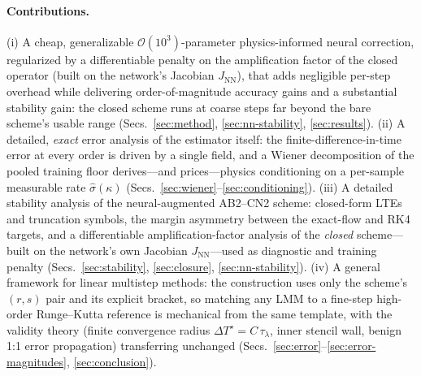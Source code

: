 \documentclass[11pt]{article}
\theoremstyle{plain}
\theoremstyle{definition}
\newcommand{\bO}{\mathcal{O}}
\newcommand{\DTs}{\Delta T^{\star}}
\newcommand{\taul}{\tau_{\lambda}}
\newcommand{\shat}{\hat{\sigma}}
\begin{document}
\paragraph{Contributions.}
(i) A cheap, generalizable $\bO(10^3)$-parameter physics-informed neural
correction, regularized by a differentiable penalty on the amplification
factor of the closed operator (built on the network's Jacobian $J_{\mathrm{NN}}$),
that adds negligible per-step overhead while delivering
order-of-magnitude accuracy gains and a substantial stability gain: the
closed scheme runs at coarse steps far beyond the bare scheme's usable
range (Secs.~\ref{sec:method},
\ref{sec:nn-stability}, \ref{sec:results}).
(ii) A detailed, \emph{exact} error analysis of the estimator itself: the
finite-difference-in-time error at every order is driven by a single field,
and a Wiener decomposition of the pooled training floor derives---and
prices---physics conditioning on a per-sample measurable rate
$\shat(\kappa)$ (Secs.~\ref{sec:wiener}--\ref{sec:conditioning}).
(iii) A detailed stability analysis of the neural-augmented AB2--CN2 scheme:
closed-form LTEs and truncation symbols, the margin asymmetry between the
exact-flow and RK4 targets, and a differentiable amplification-factor
analysis of the \emph{closed} scheme---built on the network's own Jacobian
$J_{\mathrm{NN}}$---used as diagnostic and training penalty (Secs.~\ref{sec:stability}, \ref{sec:closure},
\ref{sec:nn-stability}).
(iv) A general framework for linear multistep methods: the construction uses
only the scheme's $(r,s)$ pair and its explicit bracket, so matching any LMM
to a fine-step high-order Runge--Kutta reference is mechanical from the same
template, with the validity theory (finite convergence radius
$\DTs=C\,\taul$, inner stencil wall, benign 1:1 error propagation)
transferring unchanged (Secs.~\ref{sec:error}--\ref{sec:error-magnitudes},
\ref{sec:conclusion}).
\end{document}
